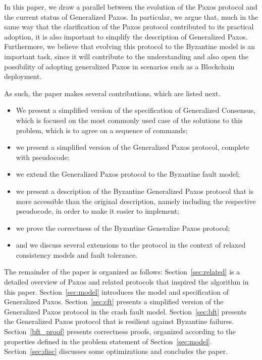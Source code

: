 
In this paper, we draw a parallel between the evolution of the Paxos
protocol and the current status of Generalized Paxos. In particular,
we argue that, much in the same way that the clarification of the Paxos
protocol contributed to its practical adoption, it is also important
to simplify the description of Generalized Paxos. Furthermore, we believe
that evolving this protocol to the Byzantine model is an important
task, since it will contribute to the understanding
and also open the possibility of adopting generalized Paxos in
scenarios such as a Blockchain deployment.

As such, the paper makes several contributions, which are listed next.
%
\begin{itemize}
\item
We present a simplified version of the specification of Generalized
Consensus, which is focused on the most commonly used case of the
solutions to this problem, which is to agree on a sequence of
commands;

\item 
we present a simplified version of the Generalized Paxos protocol, complete with pseudocode;

\item
we extend the Generalized Paxos protocol to the Byzantine fault model; 

\item
we present a description of the Byzantine Generalized Paxos protocol
that is more accessible than the original description, namely including the
respective pseudocode, in order to make it easier to implement;

\item
we prove the correctness of the Byzantine Generalize Paxos protocol;

\item
and we discuss several extensions to the protocol in the context of relaxed consistency models and fault tolerance.

\end{itemize}

The remainder of the paper is organized as follows: 
Section~\ref{sec:related} is a detailed overview of Paxos and related protocols that inspired the algorithm in this paper.
Section~\ref{sec:model} introduces the model and specification of Generalized Paxos.
Section~\ref{sec:cft} presents a simplified version of the Generalized Paxos protocol in the crash fault model. Section~\ref{sec:bft} presents the Generalized Paxos protocol that is resilient against Byzantine failures. Section~\ref{bft_proof} presents correctness proofs, organized according to the properties defined in the problem statement of Section~\ref{sec:model}. Section~\ref{sec:disc} discusses some optimizations and concludes the paper.
